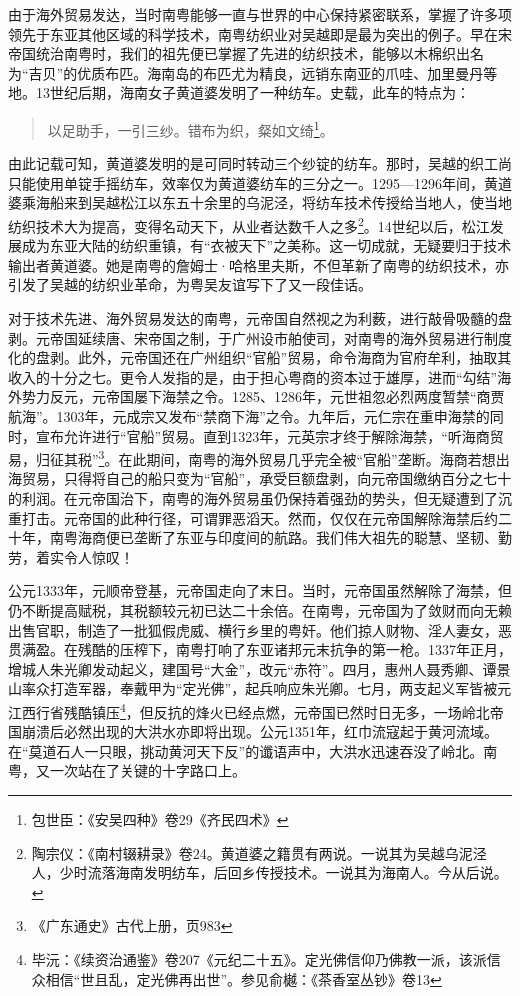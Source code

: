 由于海外贸易发达，当时南粤能够一直与世界的中心保持紧密联系，掌握了许多项领先于东亚其他区域的科学技术，南粤纺织业对吴越即是最为突出的例子。早在宋帝国统治南粤时，我们的祖先便已掌握了先进的纺织技术，能够以木棉织出名为“吉贝”的优质布匹。海南岛的布匹尤为精良，远销东南亚的爪哇、加里曼丹等地。13世纪后期，海南女子黄道婆发明了一种纺车。史载，此车的特点为：

\begin{quote}

以足助手，一引三纱。错布为织，粲如文绮\footnote{包世臣：《安吴四种》卷29《齐民四术》}。
\end{quote}

由此记载可知，黄道婆发明的是可同时转动三个纱锭的纺车。那时，吴越的织工尚只能使用单锭手摇纺车，效率仅为黄道婆纺车的三分之一。1295—1296年间，黄道婆乘海船来到吴越松江以东五十余里的乌泥泾，将纺车技术传授给当地人，使当地纺织技术大为提高，变得名动天下，从业者达数千人之多\footnote{陶宗仪：《南村辍耕录》卷24。黄道婆之籍贯有两说。一说其为吴越乌泥泾人，少时流落海南发明纺车，后回乡传授技术。一说其为海南人。今从后说。}。14世纪以后，松江发展成为东亚大陆的纺织重镇，有“衣被天下”之美称。这一切成就，无疑要归于技术输出者黄道婆。她是南粤的詹姆士·哈格里夫斯，不但革新了南粤的纺织技术，亦引发了吴越的纺织业革命，为粤吴友谊写下了又一段佳话。

对于技术先进、海外贸易发达的南粤，元帝国自然视之为利薮，进行敲骨吸髓的盘剥。元帝国延续唐、宋帝国之制，于广州设市舶使司，对南粤的海外贸易进行制度化的盘剥。此外，元帝国还在广州组织“官船”贸易，命令海商为官府牟利，抽取其收入的十分之七。更令人发指的是，由于担心粤商的资本过于雄厚，进而“勾结”海外势力反元，元帝国屡下海禁之令。1285、1286年，元世祖忽必烈两度暂禁“商贾航海”。1303年，元成宗又发布“禁商下海”之令。九年后，元仁宗在重申海禁的同时，宣布允许进行“官船”贸易。直到1323年，元英宗才终于解除海禁，“听海商贸易，归征其税”\footnote{《广东通史》古代上册，页983}。在此期间，南粤的海外贸易几乎完全被“官船”垄断。海商若想出海贸易，只得将自己的船只变为“官船”，承受巨额盘剥，向元帝国缴纳百分之七十的利润。在元帝国治下，南粤的海外贸易虽仍保持着强劲的势头，但无疑遭到了沉重打击。元帝国的此种行径，可谓罪恶滔天。然而，仅仅在元帝国解除海禁后约二十年，南粤海商便已垄断了东亚与印度间的航路。我们伟大祖先的聪慧、坚韧、勤劳，着实令人惊叹！

公元1333年，元顺帝登基，元帝国走向了末日。当时，元帝国虽然解除了海禁，但仍不断提高赋税，其税额较元初已达二十余倍。在南粤，元帝国为了敛财而向无赖出售官职，制造了一批狐假虎威、横行乡里的粤奸。他们掠人财物、淫人妻女，恶贯满盈。在残酷的压榨下，南粤打响了东亚诸邦元末抗争的第一枪。1337年正月，增城人朱光卿发动起义，建国号“大金”，改元“赤符”。四月，惠州人聂秀卿、谭景山率众打造军器，奉戴甲为“定光佛”，起兵响应朱光卿。七月，两支起义军皆被元江西行省残酷镇压\footnote{毕沅：《续资治通鉴》卷207《元纪二十五》。定光佛信仰乃佛教一派，该派信众相信“世且乱，定光佛再出世”。参见俞樾：《茶香室丛钞》卷13}，但反抗的烽火已经点燃，元帝国已然时日无多，一场岭北帝国崩溃后必然出现的大洪水亦即将出现。公元1351年，红巾流寇起于黄河流域。在“莫道石人一只眼，挑动黄河天下反”的谶语声中，大洪水迅速吞没了岭北。南粤，又一次站在了关键的十字路口上。


